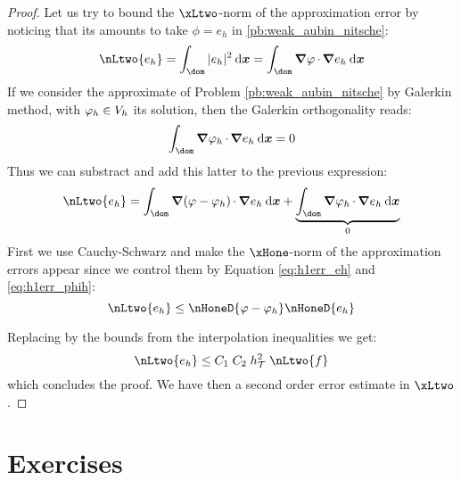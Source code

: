\begin{proof}
\medskip
Let us try to bound the $\xLtwo$-norm of the approximation error by noticing that its amounts to take $\phi = e_h$ in \eqref{pb:weak_aubin_nitsche}:
\begin{equation*}
\nLtwo{e_h} = \int_\dom |e_h|^2 \dx = \int_\dom \Grad \varphi\xDot \Grad e_h\dx
\end{equation*}
If we consider the approximate of Problem \eqref{pb:weak_aubin_nitsche} by Galerkin method, with $\varphi_h \in {{V}}_h$ its solution, then the Galerkin orthogonality reads:
\begin{equation*}
\int_\dom \Grad \varphi_h\xDot \Grad e_h\dx  = 0
\end{equation*}
Thus we can substract and add this latter to the previous expression:
\begin{equation*}
\nLtwo{e_h} = \int_\dom \Grad (\varphi - \varphi_h)\xDot \Grad e_h\dx + \underbrace{\int_\dom \Grad \varphi_h\xDot \Grad e_h\dx}_{0}
\end{equation*}
First we use Cauchy-Schwarz and make the $\xHone$-norm of the approximation errors appear since we control them by Equation \eqref{eq:h1err_eh} and \eqref{eq:h1err_phih}:
\begin{equation*}
\nLtwo{e_h} \leq \nHoneD{\varphi - \varphi_h} \nHoneD{e_h}
\end{equation*}

\medskip
Replacing by the bounds from the interpolation inequalities we get:
\begin{equation*}
\nLtwo{e_h} \leq C_1\;C_2\;\sizeT^2\;\nLtwo{f}
\end{equation*}
which concludes the proof. We have then a second order error estimate in $\xLtwo$.
\end{proof}

\newpage
\section{Exercises}


